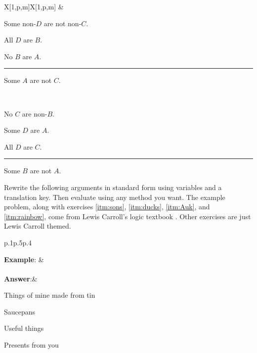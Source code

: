 {\begin{exercises}
\begin{longtabu}{X[1,p,m]X[1,p,m]}
&
\item\begin{earg}
\item[P$_1$:] Some non-$D$ are not non-$C$.
\item[P$_2$:] All $D$ are $B$.
\item[P$_3$:] No $B$ are $A$.
\vspace{-.5em}
\item [] \rule{0.6\linewidth}{.5pt} 
\item[C:] Some $A$ are not $C$.
\end{earg}
\\
\item\begin{earg}
\item[P$_1$:] No $C$ are non-$B$.
\item[P$_2$:] Some $D$ are $A$.
\item[P$_3$:] All $D$ are $C$. %
\vspace{-.5em}
\item [] \rule{0.6\linewidth}{.5pt} 
\item[C:] Some $B$ are not $A$.
\end{earg}

\end{longtabu}
\end{exercises}

\noindent\problempart Rewrite the following arguments in standard form using variables and a translation key. Then evaluate using any method you want. The example problem, along with exercises \ref{itm:sons}, \ref{itm:ducks},  \ref{itm:Auk}, and \ref{itm:rainbow}, come from Lewis Carroll's logic textbook \citep{Dodgson1896}. Other exercises are just Lewis Carroll themed.

\begin{longtabu}{p{.1\linewidth}p{.5\linewidth}p{.4\linewidth}}

\textbf{Example}: &  \\
\\
\textbf{Answer}:&
\vspace{-.5cm}
\begin{ekey}
\item[$A$:]Things of mine made from tin
\item[$B$:] Saucepans
\item[$C$:] Useful things 
\item[$D$:] Presents from you
\end{ekey}


\end{longtabu}}
